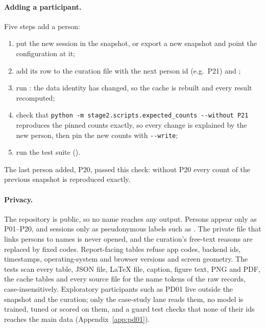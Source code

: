\paragraph{Adding a participant.} Five steps add a person:
\begin{enumerate}[nosep]
  \item put the new session in the snapshot, or export a new snapshot and point the configuration at it;
  \item add its row to the curation file with the next person id (e.g.\ P21) and ;
  \item run : the data identity has changed, so the cache is rebuilt and
    every result recomputed;
  \item check that \texttt{python -m stage2.scripts.expected\_counts -{}-without P21} reproduces the pinned counts
    exactly, so every change is explained by the new person, then pin the new counts with \texttt{-{}-write};
  \item run the test suite ().
\end{enumerate}
The last person added, P20, passed this check: without P20 every count of the previous snapshot is reproduced
exactly.

\paragraph{Privacy.} The repository is public, so no name reaches any output. Persons appear only as P01--P20,
and sessions only as pseudonymous labels such as . The private file that links persons to names is
never opened, and the curation's free-text reasons are replaced by fixed codes. Report-facing tables refuse app
codes, backend ids, timestamps, operating-system and browser versions and screen geometry. The tests scan every
table, JSON file, \LaTeX{} file, caption, figure text, PNG and PDF, the cache tables and every source file for
the name tokens of the raw records, case-insensitively. Exploratory participants such as PD01 live outside the
snapshot and the curation; only the case-study lane reads them, no model is trained, tuned or scored on them,
and a guard test checks that none of their ids reaches the main data (Appendix~\ref{app:pd01}).

